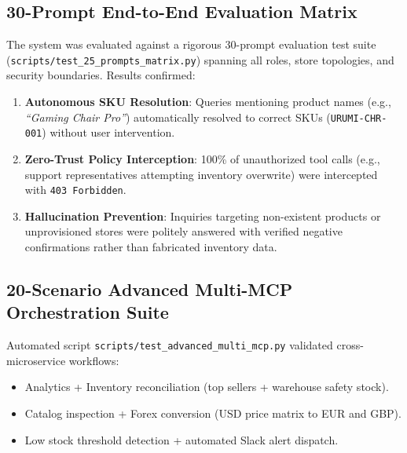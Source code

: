\documentclass[11pt,a4paper]{article}
\begin{document}
\subsection{30-Prompt End-to-End Evaluation Matrix}
The system was evaluated against a rigorous 30-prompt evaluation test suite (\texttt{scripts/test\_25\_prompts\_matrix.py}) spanning all roles, store topologies, and security boundaries. Results confirmed:
\begin{enumerate}[leftmargin=*]
    \item \textbf{Autonomous SKU Resolution}: Queries mentioning product names (e.g., \textit{``Gaming Chair Pro''}) automatically resolved to correct SKUs (\texttt{URUMI-CHR-001}) without user intervention.
    \item \textbf{Zero-Trust Policy Interception}: 100\% of unauthorized tool calls (e.g., support representatives attempting inventory overwrite) were intercepted with \texttt{403 Forbidden}.
    \item \textbf{Hallucination Prevention}: Inquiries targeting non-existent products or unprovisioned stores were politely answered with verified negative confirmations rather than fabricated inventory data.
\end{enumerate}

\subsection{20-Scenario Advanced Multi-MCP Orchestration Suite}
Automated script \texttt{scripts/test\_advanced\_multi\_mcp.py} validated cross-microservice workflows:
\begin{itemize}[leftmargin=*]
    \item Analytics + Inventory reconciliation (top sellers + warehouse safety stock).
    \item Catalog inspection + Forex conversion (USD price matrix to EUR and GBP).
    \item Low stock threshold detection + automated Slack alert dispatch.
\end{itemize}
\end{document}

